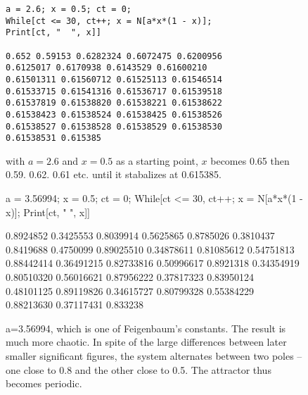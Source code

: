 \documentclass{article}
\begin{document}
\begin{figure}[h]
\begin{lstlisting}
a = 2.6; x = 0.5; ct = 0;
While[ct <= 30, ct++; x = N[a*x*(1 - x)];
Print[ct, "  ", x]]

0.652 0.59153 0.6282324 0.6072475 0.6200956
0.6125017 0.6170938 0.6143529 0.61600210 
0.61501311 0.61560712 0.61525113 0.61546514
0.61533715 0.61541316 0.61536717 0.61539518 
0.61537819 0.61538820 0.61538221 0.61538622
0.61538423 0.61538524 0.61538425 0.61538526
0.61538527 0.61538528 0.61538529 0.61538530
0.61538531 0.615385
\end{lstlisting}
\caption{with $a=2.6$ and $x=0.5$ as a starting point, $x$ becomes 0.65 then 0.59. 0.62. 0.61 etc.
until it stabalizes at 0.615385.}
\end{figure}
\begin{figure}[h]
a = 3.56994; x = 0.5; ct = 0;
While[ct <= 30, ct++; x = N[a*x*(1 - x)];
Print[ct, "  ", x]]

0.8924852 0.3425553 0.8039914 0.5625865
0.8785026 0.3810437 0.8419688 0.4750099
0.89025510 0.34878611 0.81085612 0.54751813
0.88442414 0.36491215 0.82733816 0.50996617 
0.8921318 0.34354919 0.80510320 0.56016621
0.87956222 0.37817323 0.83950124 0.48101125 
0.89119826 0.34615727 0.80799328 0.55384229 
0.88213630 0.37117431 0.833238
\caption{a=3.56994, which is one of Feigenbaum's constants.  The result is
much more chaotic. In spite of the large differences between later
smaller significant figures, the system alternates between two poles -- one
close to 0.8 and the other close to 0.5.  The attractor thus becomes
periodic.}
\end{figure}
\end{document}
